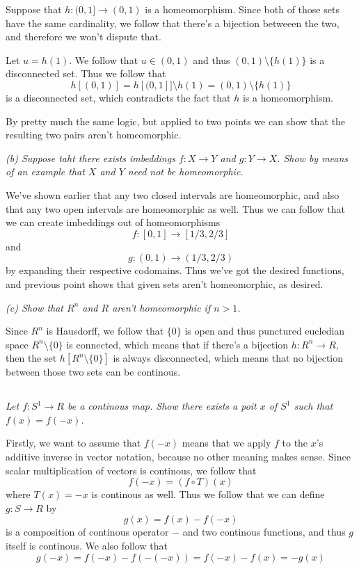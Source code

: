 \documentclass[11pt,oneside,titlepage]{book}
\newcommand{\set}[1]{\{ #1 \}}
\begin{document}
Suppose that $h: (0, 1] \to (0, 1)$ is a homeomorphism. Since both of those sets have the same
cardinality, we follow that there's a bijection betweeen the two, and therefore we won't dispute
that.

Let $u = h(1)$. We follow that $u \in (0, 1)$ and thus $(0, 1) \setminus \set{h(1)}$
is a disconnected set. Thus we follow that
$$h[(0, 1)] = h[(0, 1]] \setminus h(1) = (0, 1) \setminus \set{h(1)}$$
is a disconnected set, which contradicts the fact that $h$ is a homeomorphism.

By pretty much the same logic, but applied to two points we can show that the
resulting two pairs aren't homeomorphic.

\textit{(b) Suppose taht there exists imbeddings $f: X \to Y$ and $g: Y \to X$. Show
  by means of an example that $X$ and $Y$ need not be homeomorphic.}

We've shown earlier that any two  closed intervals  are homeomorphic, and also that any
two open intervals are homeomorphic as well. Thus we can follow that we can create imbeddings
out of homeomorphisms
$$f: [0, 1] \to [1/3, 2/3]$$
and
$$g: (0, 1) \to (1/3, 2/3)$$
by expanding their respective codomains. Thus we've got the desired functions, and previous
point shows that given sets aren't homeomorphic, as desired.

\textit{(c) Show that $R^n$ and $R$ aren't homeomorphic if $n > 1$.}

Since $R^n$ is Hausdorff, we follow that $\set{0}$ is open and thus punctured eucledian
space $R^n \setminus \set{0}$ is connected, which means that if there's a bijection $h: R^n \to R$,
then the set $h[R^n \setminus \set{0}]$ is always disconnected, which means that no bijection
between those two sets can be continous.

\subsection{}

\textit{Let $f: S^1 \to R$ be a continous map. Show there exists a poit $x$ of $S^1$ such that
  $f(x) = f(-x)$.}

Firstly, we want to assume that $f(-x)$ means that we apply $f$ to the $x$'s additive
inverse in vector notation, because no other meaning makes sense.
Since scalar multiplication of vectors is continous, we follow that
$$f(-x) = (f \circ T)(x)$$
where $T(x) = -x$ is continous as well. Thus we follow that we can define $g: S \to R$ by
$$g(x) = f(x) - f(-x)$$
is a composition of continous operator $-$ and two continous functions, and thus $g$ itself
is continous.
We also follow that
$$g(-x) = f(-x) - f(-(-x)) = f(-x) - f(x) = -g(x)$$
\end{document}
